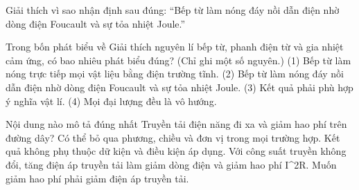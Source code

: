 \begin{bt}
Giải thích vì sao nhận định sau đúng: “Bếp từ làm nóng đáy nồi dẫn điện nhờ dòng điện Foucault và sự tỏa nhiệt Joule.”
\end{bt}

\begin{ex}
Trong bốn phát biểu về Giải thích nguyên lí bếp từ, phanh điện từ và gia nhiệt cảm ứng, có bao nhiêu phát biểu đúng? (Chỉ ghi một số nguyên.) (1) Bếp từ làm nóng trực tiếp mọi vật liệu bằng điện trường tĩnh. (2) Bếp từ làm nóng đáy nồi dẫn điện nhờ dòng điện Foucault và sự tỏa nhiệt Joule. (3) Kết quả phải phù hợp ý nghĩa vật lí. (4) Mọi đại lượng đều là vô hướng.
\end{ex}

\begin{ex}
Nội dung nào mô tả đúng nhất Truyền tải điện năng đi xa và giảm hao phí trên đường dây?
\choice
{Có thể bỏ qua phương, chiều và đơn vị trong mọi trường hợp.}
{Kết quả không phụ thuộc dữ kiện và điều kiện áp dụng.}
{\True Với công suất truyền không đổi, tăng điện áp truyền tải làm giảm dòng điện và giảm hao phí I^2R.}
{Muốn giảm hao phí phải giảm điện áp truyền tải.}
\end{ex}

